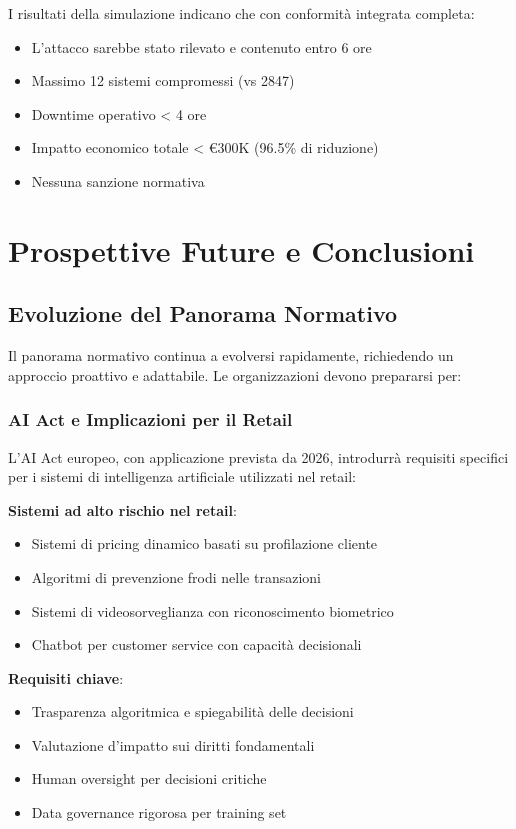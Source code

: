 I risultati della simulazione indicano che con conformità integrata completa:
\begin{itemize}
    \item L'attacco sarebbe stato rilevato e contenuto entro 6 ore
    \item Massimo 12 sistemi compromessi (vs 2847)
    \item Downtime operativo < 4 ore
    \item Impatto economico totale < €300K (96.5\% di riduzione)
    \item Nessuna sanzione normativa
\end{itemize}

\section{Prospettive Future e Conclusioni}
\label{sec:4.9_conclusioni}

\subsection{Evoluzione del Panorama Normativo}
\label{subsec:4.9.1_evoluzione}

Il panorama normativo continua a evolversi rapidamente, richiedendo un approccio proattivo e adattabile. Le organizzazioni devono prepararsi per:

\subsubsection{AI Act e Implicazioni per il Retail}

L'AI Act europeo, con applicazione prevista da 2026, introdurrà requisiti specifici per i sistemi di intelligenza artificiale utilizzati nel retail:

\textbf{Sistemi ad alto rischio nel retail}:
\begin{itemize}
    \item Sistemi di pricing dinamico basati su profilazione cliente
    \item Algoritmi di prevenzione frodi nelle transazioni
    \item Sistemi di videosorveglianza con riconoscimento biometrico
    \item Chatbot per customer service con capacità decisionali
\end{itemize}

\textbf{Requisiti chiave}:
\begin{itemize}
    \item Trasparenza algoritmica e spiegabilità delle decisioni
    \item Valutazione d'impatto sui diritti fondamentali
    \item Human oversight per decisioni critiche
    \item Data governance rigorosa per training set
\end{itemize}

